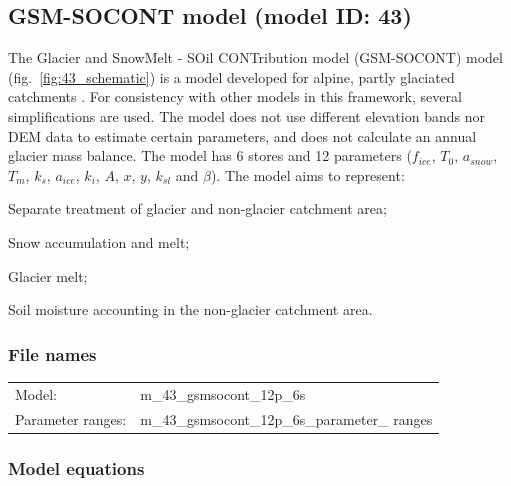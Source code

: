 \subsection{GSM-SOCONT model (model ID: 43)}
The Glacier and SnowMelt - SOil CONTribution model (GSM-SOCONT) model (fig.~\ref{fig:43_schematic}) is a model developed for alpine, partly glaciated catchments \citep{Schaefli2005}. For consistency with other models in this framework, several simplifications are used. The model does not use different elevation bands nor DEM data to estimate certain parameters, and does not calculate an annual glacier mass balance. The model has 6 stores and 12 parameters ($f_{ice}$, $T_0$, $a_{snow}$, $T_m$, $k_s$, $a_{ice}$, $k_i$, $A$, $x$, $y$, $k_{sl}$ and $\beta$). The model aims to represent:

\begin{itemizecompact}
\item Separate treatment of glacier and non-glacier catchment area;
\item Snow accumulation and melt;
\item Glacier melt;
\item Soil moisture accounting in the non-glacier catchment area.
\end{itemizecompact}

\subsubsection{File names}
\begin{tabular}{@{}ll}
Model: &m\_43\_gsmsocont\_12p\_6s \\
Parameter ranges: &m\_43\_gsmsocont\_12p\_6s\_parameter\_ ranges \\
\end{tabular}

\subsubsection{Model equations}

